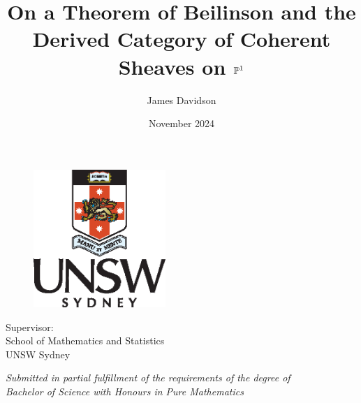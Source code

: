 \documentclass[11pt,a4paper,oneside]{book}
\title{On a Theorem of Beilinson and the Derived Category of Coherent
Sheaves on $\mathbb{P}^{{1}}$}
\author{James Davidson}
\date{November 2024}
\begin{document}
\makeatletter
\begin{titlepage}
  \begin{figure}[ht!]
    \centering
    \includegraphics[width=5cm]{resources/crest}
  \end{figure}
  \vspace{2.5cm}
  \begin{center}
    \LARGE\bfseries
    \@title
  \end{center}
  \vfill
  \begin{center}
    \Large
    \@author
  \end{center}
  \vfill
  \begin{center}
    \large
    Supervisor: \@supervisor \\
    \vspace{0.5cm}
    School of Mathematics and Statistics \\
    UNSW Sydney \\
    \vspace{0.5cm}
    \@date
  \end{center}
  \vfill
  \begin{center}
    \small\itshape
    Submitted in partial fulfillment of the requirements of the degree of \\
    Bachelor of Science with Honours in Pure Mathematics
  \end{center}
\end{titlepage}
\makeatother






{
  \pagestyle{plain}
  \hypersetup{hidelinks}
  \tableofcontents
}

\setcounter{chapter}{-1}









\appendix


{
  \printbibliography[heading=bibintoc, title=References]
}
\end{document}
